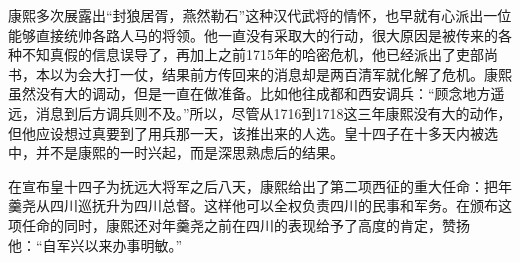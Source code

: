 
康熙多次展露出“封狼居胥，燕然勒石”这种汉代武将的情怀，也早就有心派出一位能够直接统帅各路人马的将领。他一直没有采取大的行动，很大原因是被传来的各种不知真假的信息误导了，再加上之前1715年的哈密危机，他已经派出了吏部尚书，本以为会大打一仗，结果前方传回来的消息却是两百清军就化解了危机。康熙虽然没有大的调动，但是一直在做准备。比如他往成都和西安调兵：“顾念地方遥远，消息到后方调兵则不及。”所以，尽管从1716到1718这三年康熙没有大的动作，但他应设想过真要到了用兵那一天，该推出来的人选。皇十四子在十多天内被选中，并不是康熙的一时兴起，而是深思熟虑后的结果。



在宣布皇十四子为抚远大将军之后八天，康熙给出了第二项西征的重大任命：把年羹尧从四川巡抚升为四川总督。这样他可以全权负责四川的民事和军务。在颁布这项任命的同时，康熙还对年羹尧之前在四川的表现给予了高度的肯定，赞扬他：“自军兴以来办事明敏。”


